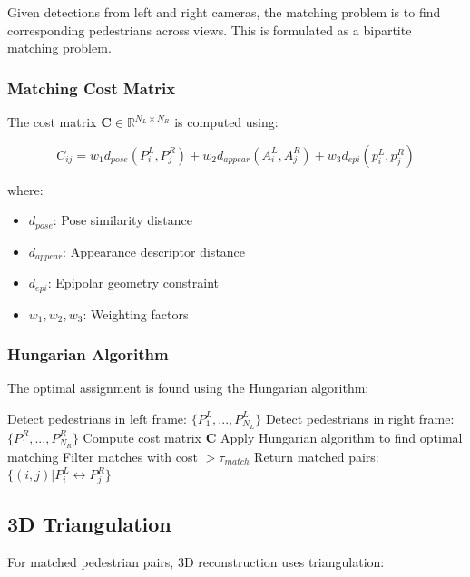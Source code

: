 \documentclass[11pt,a4paper]{article}
\begin{document}
Given detections from left and right cameras, the matching problem is to find corresponding pedestrians across views. This is formulated as a bipartite matching problem.

\subsubsection{Matching Cost Matrix}

The cost matrix $\mathbf{C} \in \mathbb{R}^{N_L \times N_R}$ is computed using:

\begin{equation}
C_{ij} = w_1 d_{pose}(P_i^L, P_j^R) + w_2 d_{appear}(A_i^L, A_j^R) + w_3 d_{epi}(p_i^L, p_j^R)
\end{equation}

where:
\begin{itemize}
    \item $d_{pose}$: Pose similarity distance
    \item $d_{appear}$: Appearance descriptor distance
    \item $d_{epi}$: Epipolar geometry constraint
    \item $w_1, w_2, w_3$: Weighting factors
\end{itemize}

\subsubsection{Hungarian Algorithm}

The optimal assignment is found using the Hungarian algorithm:

\begin{algorithm}
\caption{Stereo Pedestrian Matching}
\begin{algorithmic}[1]
\State Detect pedestrians in left frame: $\{P_1^L, ..., P_{N_L}^L\}$
\State Detect pedestrians in right frame: $\{P_1^R, ..., P_{N_R}^R\}$
\State Compute cost matrix $\mathbf{C}$
\State Apply Hungarian algorithm to find optimal matching
\State Filter matches with cost $> \tau_{match}$
\State Return matched pairs: $\{(i, j) | P_i^L \leftrightarrow P_j^R\}$
\end{algorithmic}
\end{algorithm}

\subsection{3D Triangulation}

For matched pedestrian pairs, 3D reconstruction uses triangulation:
\end{document}
